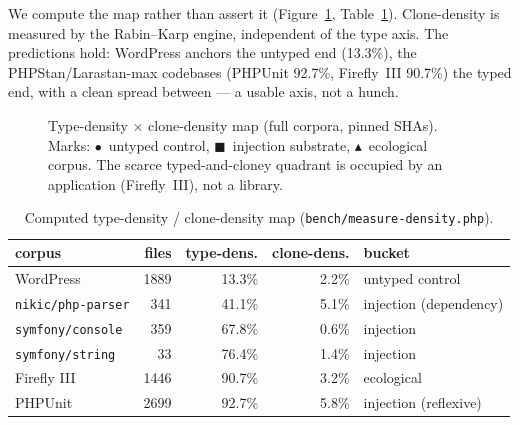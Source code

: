 \documentclass[10pt,a4paper]{article}
\begin{document}
We compute the map rather than assert it (Figure~\ref{fig:scatter}, Table~\ref{tab:density}).
Clone-density is measured by the Rabin--Karp engine, independent of the type axis. The predictions
hold: WordPress anchors the untyped end (13.3\%), the PHPStan/Larastan-max codebases (PHPUnit 92.7\%,
Firefly~III 90.7\%) the typed end, with a clean spread between --- a usable axis, not a hunch.

\begin{figure}[h]
\centering
{}
\caption{Type-density $\times$ clone-density map (full corpora, pinned SHAs).
Marks: $\bullet$~untyped control, $\blacksquare$~injection substrate,
$\blacktriangle$~ecological corpus. The scarce typed-and-cloney quadrant is occupied by an
application (Firefly~III), not a library.}
\label{fig:scatter}
\end{figure}

\begin{table}[h]
\centering
\caption{Computed type-density / clone-density map (\texttt{bench/measure-density.php}).}
\label{tab:density}
\small
\begin{tabular}{l r r r l}
\toprule
\textbf{corpus} & \textbf{files} & \textbf{type-dens.} & \textbf{clone-dens.} & \textbf{bucket} \\
\midrule
WordPress          & 1889 & 13.3\% & 2.2\% & untyped control \\
\texttt{nikic/php-parser} & 341 & 41.1\% & 5.1\% & injection (dependency) \\
\texttt{symfony/console} & 359 & 67.8\% & 0.6\% & injection \\
\texttt{symfony/string} &  33 & 76.4\% & 1.4\% & injection \\
Firefly III        & 1446 & 90.7\% & 3.2\% & ecological \\
PHPUnit            & 2699 & 92.7\% & 5.8\% & injection (reflexive) \\
\bottomrule
\end{tabular}
\end{table}
\end{document}

